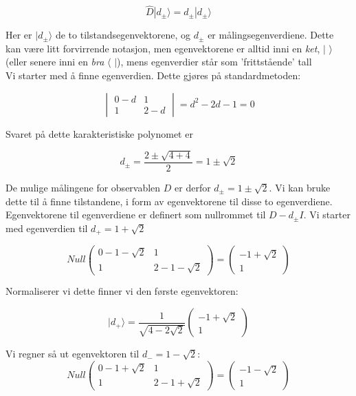 \documentclass[a4paper,norsk, 10pt]{article}
\numberwithin{equation}{section}
\begin{document}
$$
\hat{D}|d_{\pm}\rangle = d_{\pm}|d_{\pm}\rangle
$$

Her er $|d_{\pm}\rangle$ de to tilstandsegenvektorene, og $d_{\pm}$ er målingsegenverdiene. Dette kan være litt forvirrende notasjon, men egenvektorene er alltid inni en \textit{ket}, $|$ $\rangle$(eller senere inni en \textit{bra} $\langle$ $|$), mens egenverdier står som  'frittstående' tall\\

Vi starter med å finne egenverdien. Dette gjøres på standardmetoden:

$$
\begin{vmatrix}
0 - d & 1\\
1 & 2-d
\end{vmatrix}
= d^2 - 2d - 1 = 0
$$

Svaret på dette karakteristiske polynomet er 

$$
d_{\pm} = \frac{2 \pm \sqrt{4 + 4}}{2} = 1\pm \sqrt{2}
$$

De mulige målingene for observablen $D$ er derfor $d_{\pm} = 1 \pm \sqrt{2}$. Vi kan bruke dette til å finne tilstandene, i form av egenvektorene til disse to egenverdiene. Egenvektorene til egenverdiene er definert som nullrommet til $D - d_{\pm}I$. Vi starter med egenverdien til $d_+ = 1 + \sqrt{2}$

$$
Null
\begin{pmatrix}
0 -1 - \sqrt{2} & 1\\
1 & 2 -1 - \sqrt{2}
\end{pmatrix}
= 
\begin{pmatrix}
-1 + \sqrt{2}\\
1
\end{pmatrix}
$$

Normaliserer vi dette finner vi den første egenvektoren:

\begin{equation}
|d_+\rangle = \frac{1}{\sqrt{4-2\sqrt{2}}}
\begin{pmatrix}
-1 + \sqrt{2}\\
1
\end{pmatrix}
\label{eq:d+}
\end{equation}


Vi regner så ut egenvektoren til $d_- = 1-\sqrt{2}$:
$$
Null
\begin{pmatrix}
0 -1 + \sqrt{2} & 1\\
1 & 2 -1 + \sqrt{2}
\end{pmatrix}
= 
\begin{pmatrix}
-1 - \sqrt{2}\\
1
\end{pmatrix}
$$
\end{document}
